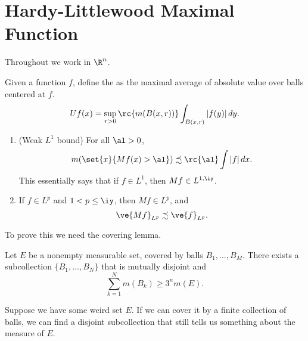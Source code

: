 \def\filepath{C:/Users/Owner/Dropbox/Math/templates}





%


%

\pagestyle{fancy}
\chead{} 
\rhead{} 
\lfoot{} 
\cfoot{\thepage} 
\rfoot{} 
\renewcommand{\headrulewidth}{.3pt} 
\setlength\voffset{0in}
\setlength\textheight{648pt}


\section{Hardy-Littlewood Maximal Function}
Throughout we work in $\R^n$.
\begin{df}
Given a function $f$, define the  as the maximal average of absolute value over balls centered at $f$.
\[
Uf(x)=\sup_{r>0} \rc{m(B(x,r))} \int_{B(x,r)} |f(y)|\,dy.
\]
\end{df}
\begin{thm}\label{thm:max-ineq}
\begin{enumerate}
\item (Weak $L^1$ bound)
For all $\al>0$, 
\[
m(\set{x}{Mf(x)>\al})\precsim \rc{\al}\int |f|\,dx.
\]
This essentially says that if $f\in L^1$, then $Mf\in L^{1,\iy}$. 
\item If $f\in L^p$ and $1<p\le \iy$, then $Mf\in L^p$, and 
\[
\ve{Mf}_{L^p}\precsim \ve{f}_{L^p}.
\]
\end{enumerate}
\end{thm}
To prove this we need the covering lemma. 
\begin{lem}\label{lem:covering}
Let $E$ be a nonempty measurable set, covered by balls $B_1,\ldots, B_M$. There exists a subcollection $\{B_1,\ldots, B_N\}$ that is mutually disjoint and
\[
\sum_{k=1}^N m(B_k) \ge 3^n m(E).
\]
\end{lem}

Suppose we have some weird set $E$. If we can cover it by a finite collection of balls, we can find a disjoint subcollection that still tells us something about the measure of $E$.

